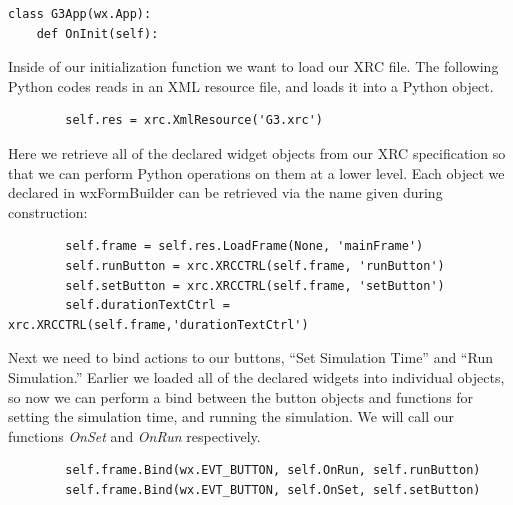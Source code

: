 \documentclass[12pt]{article}
\begin{document}
{\footnotesize
   \resetlinenumber[3]
   \linenumbers
 \begin{verbatim}
class G3App(wx.App):
    def OnInit(self): 
 \end{verbatim}
}

Inside of our initialization function we want to load our XRC file. 
The following Python codes reads in an XML resource file, and loads
it into a Python object.

{\footnotesize
   \resetlinenumber[5]
   \linenumbers
 \begin{verbatim}
        self.res = xrc.XmlResource('G3.xrc')
 \end{verbatim}
}

Here we retrieve all of the declared widget objects from our XRC 
specification so that we can perform Python operations on them at a 
lower level. Each object we declared in wxFormBuilder can be retrieved 
via the name given during construction:

{\footnotesize
   \resetlinenumber[6]
   \linenumbers
 \begin{verbatim}
        self.frame = self.res.LoadFrame(None, 'mainFrame')
        self.runButton = xrc.XRCCTRL(self.frame, 'runButton')
        self.setButton = xrc.XRCCTRL(self.frame, 'setButton')
        self.durationTextCtrl = xrc.XRCCTRL(self.frame,'durationTextCtrl')
 \end{verbatim}
}

Next we need to bind actions to our buttons, ``Set Simulation Time'' 
and ``Run Simulation.'' Earlier we loaded all of the 
declared widgets into individual objects, so now we can perform
a bind between the button objects and functions for setting the
simulation time, and running the simulation. We will 
call our functions {\it OnSet} and {\it OnRun} respectively. 

{\footnotesize
   \resetlinenumber[10]
   \linenumbers
 \begin{verbatim}
        self.frame.Bind(wx.EVT_BUTTON, self.OnRun, self.runButton)
        self.frame.Bind(wx.EVT_BUTTON, self.OnSet, self.setButton)
 \end{verbatim} 
}


\end{document}
